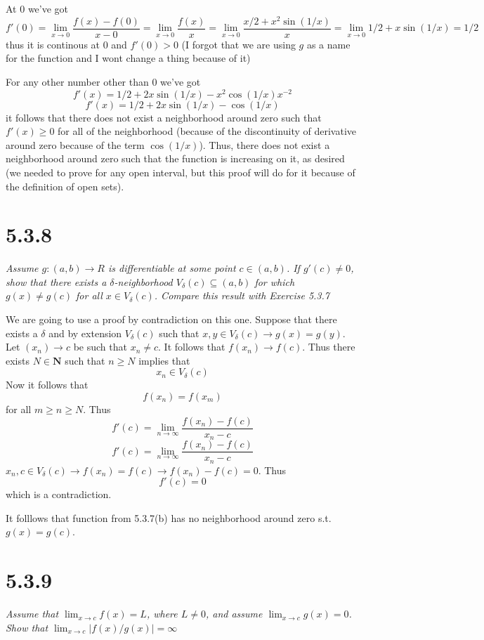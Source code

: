 \documentclass[11pt,oneside,titlepage]{book}
\begin{document}
At $0$ we've got
$$f'(0) = \lim_{x \to 0}\frac{f(x) - f(0)}{x - 0} =
\lim_{x \to 0}\frac{f(x)}{x} =
\lim_{x \to 0}\frac{x / 2 + x^2 \sin(1/x)}{x} =
\lim_{x \to 0} 1 / 2 + x \sin(1/x) = 1/2$$
thus it is continous at $0$ and $f'(0) > 0$ (I forgot that we are using $g$
as a name for the function and I wont change a thing because of it)

For any other number other than $0$ we've got
$$f'(x) =     1 / 2 + 2x \sin(1/x) - x^2  \cos(1/x)  x^{-2}$$
$$f'(x) =     1 / 2 + 2x \sin(1/x) - \cos(1/x)$$
it follows that there does not exist a neighborhood around zero such that
$f'(x) \geq 0$ for all of the neighborhood (because of the discontinuity of
derivative around zero because of the term $\cos(1/x)$). Thus, there
does not exist a neighborhood around zero such that the function is
increasing on it, as desired (we needed to prove for any open interval, but
this proof will do for it because of the definition of open sets).

\section*{5.3.8}
\textit{Assume $g: (a, b) \to R$ is differentiable at some point
  $c \in (a, b)$. If $g'(c) \neq 0$, show that there exists a
  $\delta$-neighborhood $V_\delta(c) \subseteq (a, b)$ for which
  $g(x) \neq g(c)$ for all $x \in V_\delta(c)$. Compare this result with
  Exercise 5.3.7}

We are going to use a proof by contradiction on this one. Suppose that
there exists a $\delta$ and by extension $V_\delta(c)$ such that
$x , y \in V_\delta(c) \to g(x) = g(y)$. Let $(x_n) \to c$ be such that
$x_n \neq c$. It follows that $f(x_n) \to f(c)$. Thus there
exists $N \in \textbf{N}$ such that $n \geq N$ implies that
$$x_n \in V_\delta(c)$$
Now it follows that
$$f(x_n) = f(x_m) $$
for all $m \geq n \geq N$. Thus
$$f'(c) = \lim_{n \to \infty}{\frac{f(x_n) - f(c)}{x_n - c}}$$
$$f'(c) = \lim_{n \to \infty}{\frac{f(x_n) - f(c)}{x_n - c}}$$
$x_n, c \in V_\delta(c) \to f(x_n) = f(c) \to f(x_n) - f(c) = 0$. Thus
$$f'(c) = 0$$
which is a contradiction.

It folllows that function from 5.3.7(b) has no neighborhood around zero s.t.
$g(x) = g(c)$.

\section*{5.3.9}
\textit{Assume that $\lim_{x \to c}{f(x)} = L$, where $L \neq 0$, and assume
  $\lim_{x \to c}{g(x)} = 0$. Show that $\lim_{x \to c}|f(x)/g(x)| = \infty$}
\end{document}
